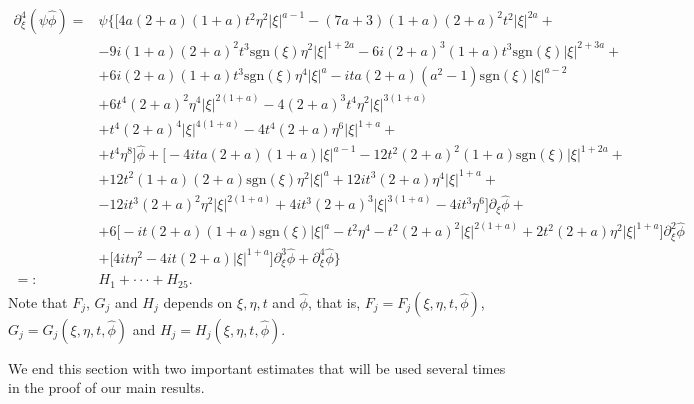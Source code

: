 \documentclass[reqno]{amsart}
\newcommand{\ha}{\hat{\phi}}
\newcommand{\si}{\sgn(\xi)}
\newcommand{\p}{\partial}
\newcommand{\sgn}{\text{sgn}}
\numberwithin{equation}{section}
\begin{document}
\begin{equation}
\begin{split}\label{F5} 
\p_\xi^{4}(\psi\ha)=&\psi \Bigg \{\Big[4a(2+a)(1+a)t^2\eta^2 |\xi|^{a-1}-(7a+3)(1+a)(2+a)^2t^2|\xi|^{2a}+\\
&-9i(1+a)(2+a)^2 t^3\si\eta^2|\xi|^{1+2a}-6i(2+a)^3(1+a)t^3\si|\xi|^{2+3a} +\\
&+6i(2+a)(1+a)t^3\sgn(\xi)\eta^4 |\xi|^a-ita(2+a)(a^2-1)\sgn(\xi)|\xi|^{a-2} \\
& +6t^4(2+a)^2 \eta^4 |\xi|^{2(1+a)}-4(2+a)^3t^4\eta^2|\xi|^{3(1+a)}\\
&+t^4 (2+a)^4 |\xi|^{4(1+a)}-4 t^4(2+a)\eta^6 |\xi|^{1+a}+\\
&+t^4 \eta^8\Big]\ha+\Big[-4ita(2+a)(1+a)|\xi|^{a-1}-12t^2(2+a)^2(1+a)\sgn(\xi)|\xi|^{1+2a}+\\
&+12t^2(1+a)(2+a)\sgn(\xi)\eta^2|\xi|^a +12it^3(2+a)\eta^4 |\xi|^{1+a}+\\
&-12it^3(2+a)^2\eta^2|\xi|^{2(1+a)}+4it^3 (2+a)^3 |\xi|^{3(1+a)}-4it^3 \eta^6\Big]\p_\xi \ha +\\
&+6\Big[-it(2+a)(1+a)\sgn(\xi)|\xi|^a -t^2\eta^4 -t^2 (2+a)^2 |\xi|^{2(1+a)}+2t^2(2+a)\eta^2|\xi|^{1+a}\Big]\p_\xi^2 \ha \\
&+\Big[ 4it \eta^2-4it(2+a)|\xi|^{1+a} \Big]\p_\xi^3 \ha +\p_\xi^4 \ha\Bigg\}\\
=:&H_1+ \cdot\cdot\cdot + H_{25}.
\end{split}
\end{equation}
Note that $F_j$, $G_j$ and $H_j$ depends on $\xi,\eta,t$ and $\hat{\phi}$, that is, $F_j=F_j(\xi,\eta,t,\hat{\phi})$, $G_j=G_j(\xi,\eta,t,\hat{\phi})$ and $H_j=H_j(\xi,\eta,t,\hat{\phi})$.





We end this section with two important estimates that will be used several times in the proof of our main results.
\end{document}
